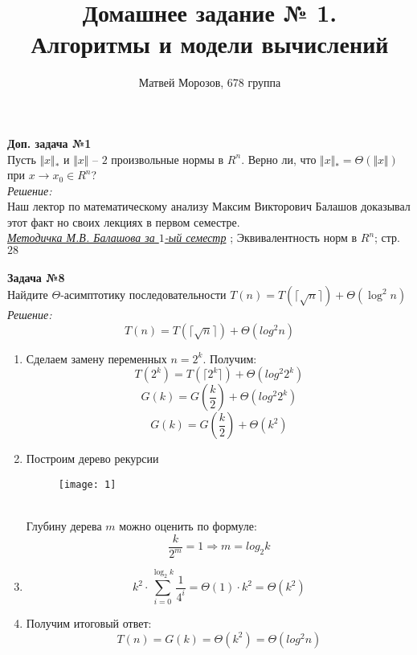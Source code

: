 \documentclass[11pt]{article}
\begin{document}
	\author{Матвей Морозов, 678 группа}
	\title{Домашнее задание № 1.\\ Алгоритмы и модели вычислений}
	\maketitle

	\textbf {Доп. задача №1}\\
	 Пусть $\Vert x \Vert_{*}$ и $\Vert x \Vert$ -- $2$ произвольные нормы в $R^{n}$. Верно ли, что $\Vert x \Vert_{*} = \Theta(\Vert x \Vert)$ при $x \rightarrow x_{0} \in R^{n}$?
	 	\\
	 	
	 	{\itshape Решение:}
	 	\\
	 	 
	 	Наш лектор по математическому анализу Максим Викторович Балашов доказывал этот факт но своих лекциях в первом семестре. 
	 	\\
	 	
	 	{\href{https://mipt.ru/education/chair/mathematics/upload/0a5/balashov_mv_1.pdf}{ {\itshape Методичка М.В. Балашова за $1$-ый семестр}}} ; Эквивалентность норм в $R^n$; стр. $28$
	 	\\
	 	\\
	 	
	 	\textbf {Задача №8}
	 	\\
	 	Найдите $\Theta$-асимптотику последовательности $T(n) = T(\lceil \sqrt{n} \rceil) + \Theta (\log^{2}n)$
	 		 	\\
	 	
	 	{\itshape Решение:}
	 	\\
	 	\[T(n) = T(\lceil \sqrt{n} \rceil) + \Theta (log^{2}n)\]
	 	\begin{enumerate}
	 		\item Сделаем замену переменных $n = 2^{k}$. Получим:
	 		\[T(2^k) = T(\lceil 2^k \rceil) + \Theta (log^{2}2^k)\]
	 		\[G(k) = G(\frac{k}{2}) + \Theta (log^{2}2^{k})\]
	 		\[G(k) = G(\frac{k}{2}) + \Theta (k^2)\]
	 		\item Построим дерево рекурсии
	 		\begin{figure} [h!]
	 			\centering
	 			\texttt{[image: 1]}
	 		\end{figure}
 		\\
 		Глубину дерева $m$ можно оценить по формуле:
 		\[\frac {k}{2^m} = 1 \Rightarrow m = log_{2}k\]
 		\item \[k^{2} \cdot \sum_{i=0}^{\log_{2}k} \frac{1}{4^i} = \Theta(1) \cdot k^2 = \Theta(k^2) \]
	 	\item Получим итоговый ответ:
	 	\[T(n) = G(k) = \Theta (k^2) = \Theta (log^{2}n)\]
	 	\end{enumerate}
\end{document}

